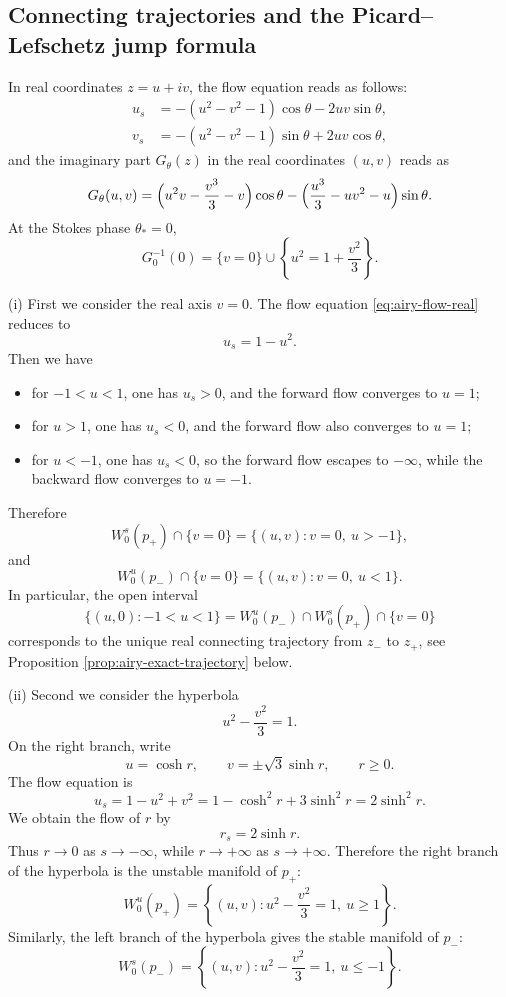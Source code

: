 \documentclass[11pt]{amsart}
\theoremstyle{plain}
\begin{document}
\subsection{Connecting trajectories and the Picard--Lefschetz jump formula}
In real coordinates \(z=u+iv\), the flow equation reads as follows:
\begin{equation}\label{eq:airy-flow-real}
\begin{aligned}
u_s&=-(u^2-v^2-1)\cos\theta-2uv\sin\theta,
\\
v_s&=-(u^2-v^2-1)\sin\theta+2uv\cos\theta,
\end{aligned}
\end{equation}
and the imaginary part $G_{\theta}(z)$ in the real coordinates $(u,v)$ reads as 
\begin{equation*}
G_\theta(u,v)
=\Bigl(u^2v-\frac{v^3}{3}-v\Bigr)\cos\theta
-\Bigl(\frac{u^3}{3}-uv^2-u\Bigr)\sin\theta.
\end{equation*}
At the Stokes phase $\theta_*=0$, 
\begin{equation*}
G_0^{-1}(0)
=
\{v=0\}\cup\left\{u^2=1+\frac{v^2}{3}\right\}.
\end{equation*}


\noindent(i) First we consider the real axis \(v=0\). The flow equation \eqref{eq:airy-flow-real} reduces to
\[
u_s=1-u^2.
\]
Then we have 
\begin{itemize}
\item for \(-1<u<1\), one has \(u_s>0\), and the forward flow converges to \(u=1\);
\item for \(u>1\), one has \(u_s<0\), and the forward flow also converges to \(u=1\);
\item for \(u<-1\), one has \(u_s<0\), so the forward flow
escapes to \(-\infty\), while the backward flow converges to \(u=-1\). 
\end{itemize}
Therefore
\[
W_0^s(p_+)\cap \{v=0\}
=
\{(u,v):v=0,\ u>-1\},
\]
and
\[
W_0^u(p_-)\cap \{v=0\}
=
\{(u,v):v=0,\ u<1\}.
\]
In particular, the open interval
\[
\{(u,0):-1<u<1\}=W_0^u(p_-)\cap W_0^s(p_+)\cap \{v=0\}
\]
corresponds to the unique real connecting trajectory from \(z_-\) to \(z_+\), see Proposition \ref{prop:airy-exact-trajectory} below.

\smallskip
\noindent (ii) Second we consider the hyperbola
\[
u^2-\frac{v^2}{3}=1.
\]
On the right branch, write
\[
u=\cosh r,\qquad v=\pm \sqrt3\sinh r,\qquad r\ge 0.
\]
The flow equation is
\[
u_s=1-u^2+v^2
=
1-\cosh^2 r+3\sinh^2 r
=
2\sinh^2 r.
\]
We obtain the flow of $r$ by
\[
r_s=2\sinh r.
\]
Thus \(r\to 0\) as \(s\to-\infty\), while \(r\to+\infty\) as \(s\to+\infty\).
Therefore the right branch of the hyperbola is the unstable manifold of \(p_+\):
\[
W_0^u(p_+)
=
\left\{
(u,v):u^2-\frac{v^2}{3}=1,\ u\ge 1
\right\}.
\]
Similarly, the left branch of the hyperbola gives the stable
manifold of \(p_-\):
\[
W_0^s(p_-)
=
\left\{
(u,v):u^2-\frac{v^2}{3}=1,\ u\le -1
\right\}.
\]
\end{document}
